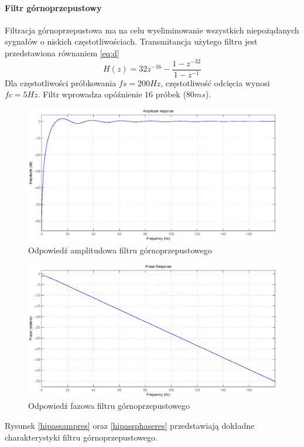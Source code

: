 \documentclass[a4paper, 11pt]{article}
\begin{document}
\paragraph{Filtr górnoprzepustowy}
Filtracja górnoprzepustowa ma na celu wyeliminowanie wszystkich niepożądanych sygnałów o niskich częstotliwościach. Transmitancja użytego filtru jest przedstawiona równaniem \eqref{eq:d}
\begin{equation}
H(z) = 32z^{-16} -\frac{1-z^{-32}}{1-z^{-1}}\label{eq:d}
\end{equation}
\indent Dla częstotliwości próbkowania $fs = 200 Hz$, częstotliwość odcięcia wynosi $fc = 5 Hz$.
Filtr wprowadza opóźnienie $16$ próbek ($80 ms$).
\begin{figure}[h]
\centering
\includegraphics[scale=0.5]{include/hipassampres.eps}
\caption{Odpowiedź amplitudowa filtru górnoprzepustowego}
\label{hipassampres}
\end{figure}
\begin{figure}[h]
\centering
\includegraphics[scale=0.5]{include/hipassphaseres.eps}
\caption{Odpowiedź fazowa filtru górnoprzepustowego}
\label{hipassphaseres}
\end{figure}
\newpage
Rysunek \eqref{hipassampres} oraz \eqref{hipassphaseres} przedstawiają dokładne charakterystyki filtru górnoprzepustowego. 
\end{document}
